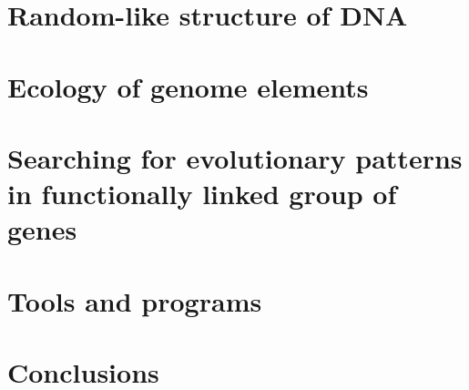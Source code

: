 \documentclass[english,b5paper,11pt]{scrbook} %
\begin{document}
\chapter{Random-like structure of DNA} 
\label{chap:dna_struct}


\chapter{Ecology of genome elements} 
\label{chap:untb_genomes}



\chapter{Searching for evolutionary patterns in functionally linked group of genes} 
\label{chap:gssa}


\chapter{Tools and programs} 
\label{chap:tools}


\chapter{Conclusions} 
\label{conclusion}



\begin{titlepage}
  \fancyhf{}
\end{titlepage}


\end{document}

